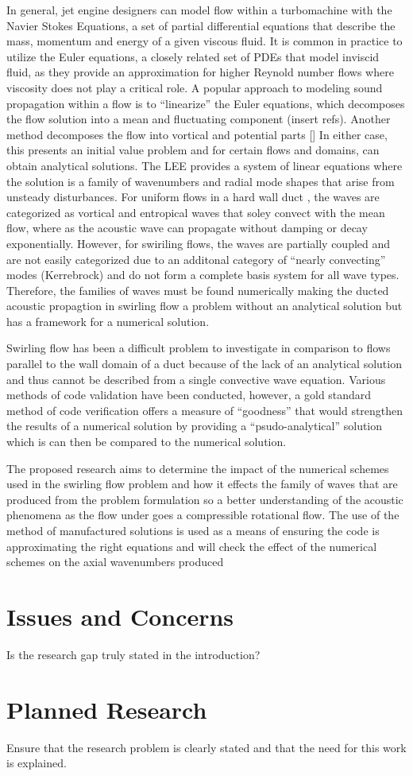 \documentclass[a4paper]{article}
\begin{document}
In general, jet engine designers can model flow within a turbomachine with 
the Navier Stokes Equations, a set 
of partial differential equations that describe the mass, momentum and energy
of a given viscous fluid. It is common in practice to utilize the Euler equations,
a closely related set of PDEs that model inviscid fluid, as they provide an 
approximation for higher Reynold number flows where viscosity 
does not play a critical role. A popular approach to modeling sound propagation 
within a flow is to ``linearize'' the Euler equations, which decomposes the 
flow solution into a mean and fluctuating component (insert refs). Another method
decomposes the flow into vortical and potential parts [\cite{golubev1996sound}] 
In either case, this presents an initial value problem and for certain flows and
domains, can obtain analytical solutions.  The LEE provides a system of linear 
equations where the solution is a family of wavenumbers and radial mode shapes 
that arise from unsteady disturbances.  For uniform flows in a hard wall duct , 
the waves are categorized as vortical and entropical waves that soley convect 
with the mean flow, where as the acoustic wave can propagate without damping or 
decay exponentially.  However, for swiriling flows, the waves are partially coupled
and are not easily categorized due to an additonal category of ``nearly convecting'' 
modes (Kerrebrock) and do not form a complete basis system for all wave types.
Therefore, the families of waves must be found numerically \cite{Envia2004}
making the ducted acoustic propagtion in swirling flow a problem without
an analytical solution but has a framework for a numerical solution.

Swirling flow has been a difficult problem to investigate in comparison to 
flows parallel to the wall domain of a duct \cite{COOPER2001} because of the 
lack of an analytical solution and thus cannot be described from a single convective 
wave equation. Various methods of code validation have been
conducted, however, a gold standard method of code verification offers a measure
of ``goodness'' that would strengthen the results of a numerical solution by 
providing a ``psudo-analytical'' solution which is can then be compared to the 
numerical solution.   

The proposed research aims to determine the impact of the numerical schemes used
in the swirling flow problem and how it effects the family of waves that are
produced from the problem formulation so a better understanding of the 
acoustic phenomena as the flow under goes a compressible rotational flow. The use
of the method of manufactured solutions is used as a means of ensuring the code is
approximating the right equations and will check the effect of the numerical schemes
on the axial wavenumbers produced 
\section{Issues and Concerns}
Is the research gap truly stated in the introduction?

\section{Planned Research} 

Ensure that the research problem is clearly stated and that the need for this
work is explained.


\end{document}
